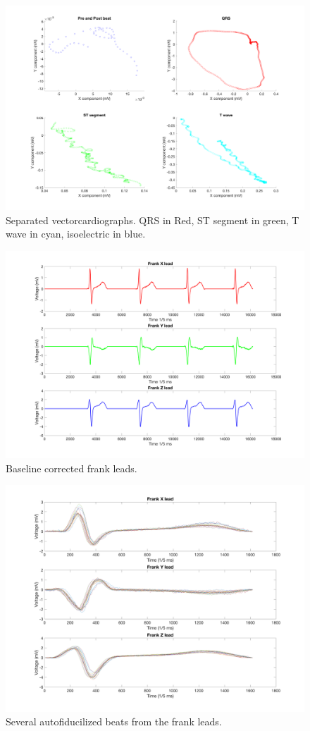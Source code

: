 \documentclass[12pt]{article}
\begin{document}
\begin{figure}[H]
	
	\centering
	\includegraphics[width = .8\textwidth]{Figures/LimLeads5.png}
	\caption{Separated vectorcardiographs. QRS in Red, ST segment in green, T wave in cyan, isoelectric in blue. }
	\label{fig:Limb5}
\end{figure}

\begin{figure}[H]
	
	\centering
	\includegraphics[width = .8\textwidth]{Figures/FrankLeads1.png}
	\caption{ Baseline corrected frank leads. }
	\label{fig:Frank1}
\end{figure}

\begin{figure}[H]
	
	\centering
	\includegraphics[width = .8\textwidth]{Figures/FrankLeads2.png}
	\caption{ Several autofiducilized beats from the frank leads.}
	\label{fig:Frank2}
\end{figure}
\end{document}
